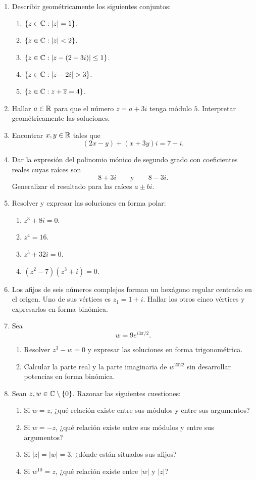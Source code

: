 \begin{enumerate}[label=\textbf{\arabic*.},leftmargin=*]
\item Describir geométricamente los siguientes conjuntos:
\begin{enumerate}[label=\alph*)]
\item \(\{z\in\mathbb{C}:|z|=1\}\).
\item \(\{z\in\mathbb{C}:|z|<2\}\).
\item \(\{z\in\mathbb{C}:|z-(2+3i)|\leq1\}\).
\item \(\{z\in\C:|z-2i|>3\}\).
\item \(\{z\in\mathbb{C}:z+\overline z=4\}\).
\end{enumerate}

\item Hallar \(a\in\mathbb{R}\) para que el número \(z=a+3i\) tenga módulo \(5\). Interpretar geométricamente las soluciones.

\item Encontrar \(x,y\in\mathbb{R}\) tales que
\[
(2x-y)+(x+3y)i=7-i.
\]

\item Dar la expresión del polinomio mónico de segundo grado con coeficientes reales cuyas raíces son
\[
8+3i\qquad\text{y}\qquad8-3i.
\]
Generalizar el resultado para las raíces \(a\pm bi\).

\item Resolver y expresar las soluciones en forma polar:
\begin{enumerate}[label=\alph*)]
\item \(z^3+8i=0\).
\item \(z^4=16\).
\item \(z^5+32i=0\).
\item \((z^2-7)(z^3+i)=0\).
\end{enumerate}

\item Los afijos de seis números complejos forman un hexágono regular centrado en el origen. Uno de sus vértices es \(z_1=1+i\). Hallar los otros cinco vértices y expresarlos en forma binómica.

\item Sea
\[
w=9e^{i3\pi/2}.
\]
\begin{enumerate}[label=\alph*)]
\item Resolver \(z^3-w=0\) y expresar las soluciones en forma trigonométrica.
\item Calcular la parte real y la parte imaginaria de \(w^{2022}\) sin desarrollar potencias en forma binómica.
\end{enumerate}

\item Sean \(z,w\in\mathbb{C}\setminus\{0\}\). Razonar las siguientes cuestiones:
\begin{enumerate}[label=\alph*)]
\item Si \(w=\overline z\), ¿qué relación existe entre sus módulos y entre sus argumentos?
\item Si \(w=-z\), ¿qué relación existe entre sus módulos y entre sus argumentos?
\item Si \(|z|=|w|=3\), ¿dónde están situados sus afijos?
\item Si \(w^{10}=z\), ¿qué relación existe entre \(|w|\) y \(|z|\)?
\end{enumerate}


\end{enumerate}
